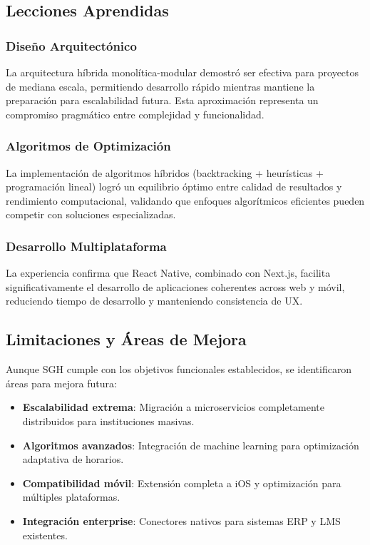 \subsection{Lecciones Aprendidas}

\subsubsection{Diseño Arquitectónico}
La arquitectura híbrida monolítica-modular demostró ser efectiva para proyectos de mediana escala, permitiendo desarrollo rápido mientras mantiene la preparación para escalabilidad futura. Esta aproximación representa un compromiso pragmático entre complejidad y funcionalidad.

\subsubsection{Algoritmos de Optimización}
La implementación de algoritmos híbridos (backtracking + heurísticas + programación lineal) logró un equilibrio óptimo entre calidad de resultados y rendimiento computacional, validando que enfoques algorítmicos eficientes pueden competir con soluciones especializadas.

\subsubsection{Desarrollo Multiplataforma}
La experiencia confirma que React Native, combinado con Next.js, facilita significativamente el desarrollo de aplicaciones coherentes across web y móvil, reduciendo tiempo de desarrollo y manteniendo consistencia de UX.

\subsection{Limitaciones y Áreas de Mejora}

Aunque SGH cumple con los objetivos funcionales establecidos, se identificaron áreas para mejora futura:

\begin{itemize}
\item \textbf{Escalabilidad extrema}: Migración a microservicios completamente distribuidos para instituciones masivas.
\item \textbf{Algoritmos avanzados}: Integración de machine learning para optimización adaptativa de horarios.
\item \textbf{Compatibilidad móvil}: Extensión completa a iOS y optimización para múltiples plataformas.
\item \textbf{Integración enterprise}: Conectores nativos para sistemas ERP y LMS existentes.
\end{itemize}

